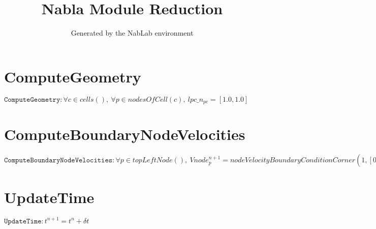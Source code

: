 \documentclass[11pt]{article}
\title{Nabla Module Reduction}
\author{Generated by the NabLab environment}
\begin{document}
\maketitle


\section{ComputeGeometry}
$\texttt{ComputeGeometry} : \forall{c\in cells()}, \ \forall{p\in nodesOfCell(c)}, \ lpc\_n_{pc} = \left[1.0,1.0\right]$


\section{ComputeBoundaryNodeVelocities}
$\texttt{ComputeBoundaryNodeVelocities} : \forall{p\in topLeftNode()}, \ Vnode^{n+1}_{p} = nodeVelocityBoundaryConditionCorner\left(1,\left[0.0,0.0\right],1,\left[0.0,0.0\right],\left[\left[1.0,1.0\right],\left[1.0,1.0\right]\right],\left[1.0,1.0\right],\sum_{c\in cellsOfNode(p)}\left(lpc\_n_{pc}\right)\right)$


\section{UpdateTime}
$\texttt{UpdateTime} : t^{n+1} = t^{n} + \delta t$
\end{document}
